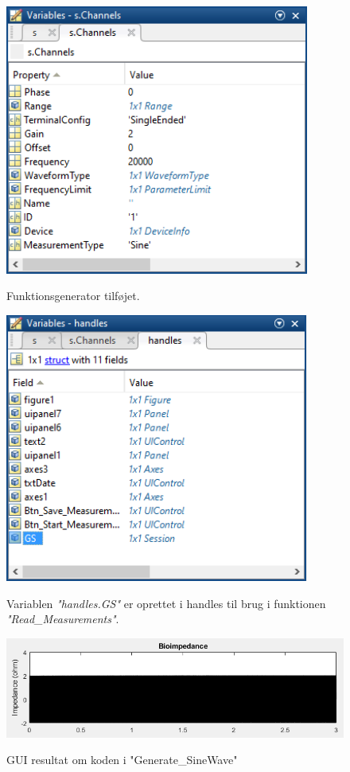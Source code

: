 \begin{figure}[H] 
\centering
{\includegraphics[width=10cm]
{Figure/modultestsinus4}}
\caption{Funktionsgenerator tilføjet.}
\label{fig:modultestsinus4}
\end{figure}

\begin{figure}[H] 
\centering
{\includegraphics[width=10cm]
{Figure/modultestsinus5}}
\caption{Variablen \textit{"handles.GS"} er oprettet i handles til brug i funktionen \textit{"Read\_Measurements"}.}
\label{fig:modultestsinus5}
\end{figure}



\begin{figure}[H] 
\centering
{\includegraphics[width=\linewidth]
{Figure/modultestsinus}}
\caption{GUI resultat om koden i "Generate\_SineWave"}
\label{fig:modultestsinus}
\end{figure}







